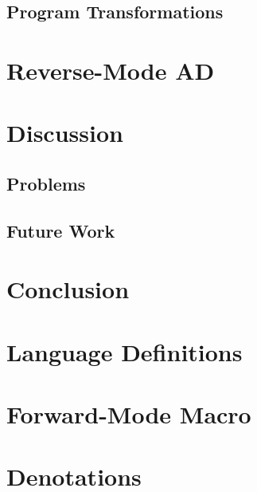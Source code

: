\documentclass[11pt, final]{article}
\begin{document}
  \subsection{Program Transformations}
\section{Reverse-Mode AD}
\section{Discussion}
  \subsection{Problems}
  \subsection{Future Work}
\section{Conclusion}

\appendix
\section{Language Definitions}
\section{Forward-Mode Macro}
\section{Denotations}
\printbibliography
\makeatother
\end{document}
